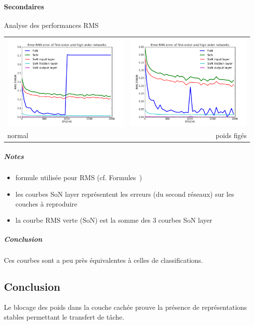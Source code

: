     \paragraph{Secondaires}
       Analyse des performances RMS
      \begin{center}
	\begin{tabular}{lr}
	  \hspace*{-1cm}
	  \includegraphics[width=250px]{data/expB5/rms.png}
	  &
	  \includegraphics[width=250px]{data/expB5/rms_block.png} \\
	  normal
	  &
	  poids figés
	\end{tabular}
      \end{center} 
      \subparagraph{Notes}
	\begin{itemize}
	  \item formule utilisée pour RMS (cf. Formules~)
	  \item les courbes SoN layer représentent les erreurs (du second réseaux) sur les couches à reproduire 
	  \item la courbe RMS verte (SoN) est la somme des 3 courbes SoN layer
	\end{itemize}
      \subparagraph{Conclusion}
	Ces courbes sont a peu près équivalentes à celles de classifications.

  \subsection{Conclusion}
    Le blocage des poids dans la couche cachée prouve la présence de représentations stables permettant le 
  transfert de tâche.
  

